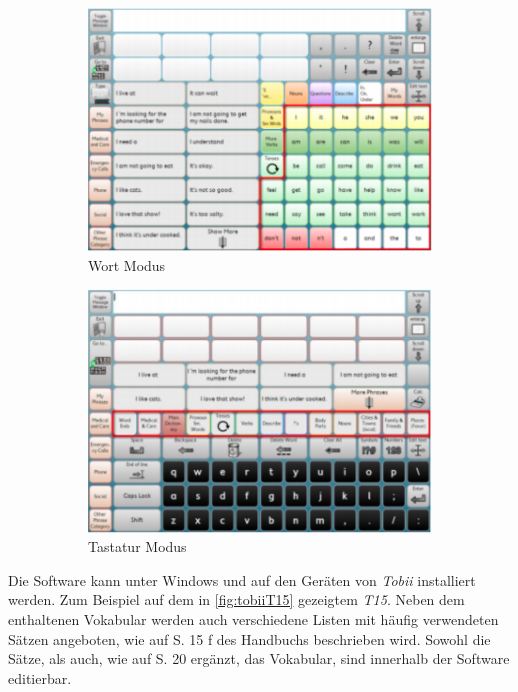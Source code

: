             \begin{figure}[H]
				\centering
				\begin{subfigure}{.49\linewidth}
  					\centering
  					\includegraphics[width=.8\linewidth]{images/sonoScribeWords.png}
  					\caption{Wort Modus 
                    	\parencite[S. 13]{tobii:sonoScribeManual}
                    }
                    \label{fig:sonoScribeWords}
				\end{subfigure}
				\begin{subfigure}{.49\linewidth}
  					\centering
  					\includegraphics[width=.8\linewidth]{images/SonoScribeKeboard.png}
  					\caption{Tastatur Modus 
                    	\parencite[S. 22]{tobii:sonoScribeManual}
                    }
                    \label{fig:sonoScribeKeyboard}
				\end{subfigure}
                \caption{ }
                \label{fig:sonoScribe}
			\end{figure}
        	
            Die Software kann unter Windows und auf den Geräten von \emph{Tobii} installiert werden. Zum Beispiel auf dem in \autoref{fig:tobiiT15} gezeigtem \emph{T15}. Neben dem enthaltenen Vokabular werden auch verschiedene Listen mit häufig verwendeten Sätzen angeboten, wie auf S. 15 f des Handbuchs beschrieben wird. Sowohl die Sätze, als auch, wie auf S. 20 ergänzt, das Vokabular, sind innerhalb der Software editierbar.
            
